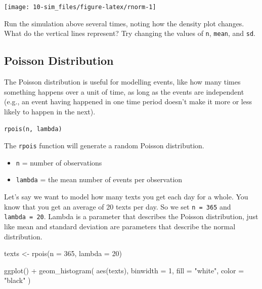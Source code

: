 \documentclass[
  oneside]{book}
\newenvironment{Shaded}{\begin{snugshade}}{\end{snugshade}}
\newcommand{\AttributeTok}[1]{\textcolor[rgb]{0.77,0.63,0.00}{#1}}
\newcommand{\DecValTok}[1]{\textcolor[rgb]{0.00,0.00,0.81}{#1}}
\newcommand{\FunctionTok}[1]{\textcolor[rgb]{0.00,0.00,0.00}{#1}}
\newcommand{\NormalTok}[1]{#1}
\newcommand{\OtherTok}[1]{\textcolor[rgb]{0.56,0.35,0.01}{#1}}
\newcommand{\SpecialCharTok}[1]{\textcolor[rgb]{0.00,0.00,0.00}{#1}}
\newcommand{\StringTok}[1]{\textcolor[rgb]{0.31,0.60,0.02}{#1}}
\providecommand{\tightlist}{%
  \setlength{\itemsep}{0pt}\setlength{\parskip}{0pt}}
\begin{document}
\begin{center}\texttt{[image: 10-sim\_files/figure-latex/rnorm-1]} \end{center}

\begin{info}
Run the simulation above several times, noting how the density plot changes. What do the vertical lines represent? Try changing the values of \texttt{n}, \texttt{mean}, and \texttt{sd}.

\end{info}

\hypertarget{poisson}{%
\subsection{Poisson Distribution}\label{poisson}}

The Poisson distribution is useful for modelling events, like how many times something happens over a unit of time, as long as the events are independent (e.g., an event having happened in one time period doesn't make it more or less likely to happen in the next).

\texttt{rpois(n,\ lambda)}

The \texttt{rpois} function will generate a random Poisson distribution.

\begin{itemize}
\tightlist
\item
  \texttt{n} = number of observations
\item
  \texttt{lambda} = the mean number of events per observation
\end{itemize}

Let's say we want to model how many texts you get each day for a whole. You know that you get an average of 20 texts per day. So we set \texttt{n\ =\ 365} and \texttt{lambda\ =\ 20}. Lambda is a parameter that describes the Poisson distribution, just like mean and standard deviation are parameters that describe the normal distribution.

\begin{Shaded}
\begin{Highlighting}[]
\NormalTok{texts }\OtherTok{\textless{}{-}} \FunctionTok{rpois}\NormalTok{(}\AttributeTok{n =} \DecValTok{365}\NormalTok{, }\AttributeTok{lambda =} \DecValTok{20}\NormalTok{)}

\FunctionTok{ggplot}\NormalTok{() }\SpecialCharTok{+}
  \FunctionTok{geom\_histogram}\NormalTok{(}
    \FunctionTok{aes}\NormalTok{(texts), }
    \AttributeTok{binwidth =} \DecValTok{1}\NormalTok{, }
    \AttributeTok{fill =} \StringTok{"white"}\NormalTok{, }
    \AttributeTok{color =} \StringTok{"black"}
\NormalTok{  )}
\end{Highlighting}
\end{Shaded}
\end{document}
